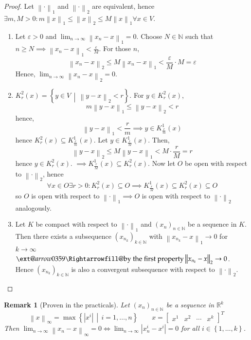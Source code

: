 \documentclass{article}
\makeatletter
\newtheorem{remark}{Remark}  \numberwithin{remark}{section}
\newcommand{\set}[1]{\left\{#1\right\}}
\newcommand{\setdef}[2]{\left\{\left.#1\,\middle|\,#2\right.\right\}}
\newcommand{\norm}[1]{\left\|#1\right\|}
\newcommand{\card}[1]{\left|#1\right|}
\newcommand{\xRightarrow}[2][]{\ext@arrow 0359\Rightarrowfill@{#1}{#2}}
\makeatother
\begin{document}
\begin{proof}
  Let $\norm{\cdot}_1$ and $\norm{\cdot}_2$ are equivalent, hence $\exists m, M > 0: m \norm{x}_1 \leq \norm{x}_2 \leq M \norm{x}_1 \forall x \in V$.
  \begin{enumerate}
    \item Let $\varepsilon > 0$ and $\lim_{n\to\infty} \norm{x_n - x}_1 = 0$.
      Choose $N \in \mathbb N$ such that $n \geq N \implies \norm{x_n - x}_1 < \frac{\varepsilon}{M}$. For those $n$,
      \[ \norm{x_n - x}_2 \leq M \norm{x_n - x}_1 < \frac{\varepsilon}{M} \cdot M = \varepsilon \]
      Hence, $\lim_{n\to\infty} \norm{x_n - x}_2 = 0$.
    \item $K_r^2(x) = \setdef{y \in V}{\norm{y - x}_2 < r}$. For $y \in K_r^2(x)$,
      \[ m \norm{y - x}_1 \leq \norm{y - x}_2 < r \]
      hence,
      \[ \norm{y - x}_1 < \frac rm \implies y \in K_{\frac rm}^1(x) \]
      hence $K_r^2(x) \subseteq K_{\frac rm}^1(x)$.
      Let $y \in K_{\frac rM}^1(x)$. Then,
      \[ \norm{y - x}_2 \leq M \norm{y - x}_1 < M \cdot \frac rM = r \]
      hence $y \in K_r^2(x)$. $\implies K_{\frac rM}^1(x) \subseteq K_r^2(x)$.
      Now let $O$ be open with respect to $\norm{\cdot}_2$, hence
      \[ \forall x \in O \exists r > 0: K_r^2(x) \subseteq O \implies K_{\frac rM}^1(x) \subseteq K_r^2(x) \subseteq O \]
      so $O$ is open with respect to $\norm{\cdot}_1 \implies O$ is open with respect to $\norm{\cdot}_2$ analogously.
    \item
      Let $K$ be compact with respect to $\norm{\cdot}_1$ and $(x_n)_{n \in \mathbb N}$ be a sequence in $K$.
      Then there exists a subsequence $(x_{n_k})_{k \in \mathbb N}$ with $\norm{x_{n_k} - x}_1 \to 0$ for $k \to \infty$
      $\xRightarrow{\text{by the first property}} \norm{x_{n_k} - x}_2 \to 0$. Hence $(x_{n_k})_{k \in \mathbb N}$ is also a convergent subsequence with respect to $\norm{\cdot}_2$.
  \end{enumerate}
\end{proof}

\begin{remark}[Proven in the practicals]
  Let $(x_n)_{n\in\mathbb N}$ be a sequence in $\mathbb R^k$
  \[ \norm{x}_{\infty} = \max\setdef{\card{x^i}}{i = 1, \dots, n} \qquad x = \begin{bmatrix} x^1 & x^2 & \cdots & x^k \end{bmatrix}^T \]
  Then $\lim_{n\to\infty} \norm{x_n - x}_{\infty} = 0 \iff \lim_{n\to\infty} \card{x_n^i - x^i} = 0$ for all $i \in \set{1, \dots, k}$.
\end{remark}
\end{document}
